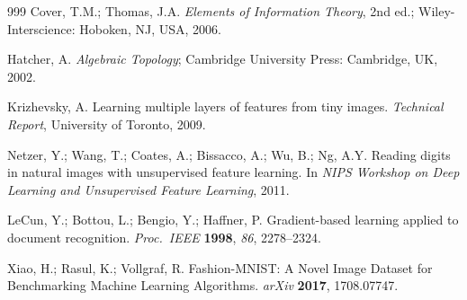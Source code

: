 \documentclass[make,article,submit,pdftex,moreauthors]{Definitions/mdpi}
\begin{document}
\begin{thebibliography}{999}
Cover, T.M.; Thomas, J.A.
\textit{Elements of Information Theory}, 2nd ed.;
Wiley-Interscience: Hoboken, NJ, USA, 2006.

Hatcher, A.
\textit{Algebraic Topology};
Cambridge University Press: Cambridge, UK, 2002.

Krizhevsky, A.
Learning multiple layers of features from tiny images.
\textit{Technical Report}, University of Toronto, 2009.

Netzer, Y.; Wang, T.; Coates, A.; Bissacco, A.; Wu, B.; Ng, A.Y.
Reading digits in natural images with unsupervised feature learning.
In \textit{NIPS Workshop on Deep Learning and Unsupervised Feature Learning},
2011.

LeCun, Y.; Bottou, L.; Bengio, Y.; Haffner, P.
Gradient-based learning applied to document recognition.
\textit{Proc.\ IEEE} \textbf{1998}, \textit{86}, 2278--2324.

Xiao, H.; Rasul, K.; Vollgraf, R.
Fashion-{MNIST}: A Novel Image Dataset for Benchmarking Machine Learning
Algorithms.
\textit{arXiv} \textbf{2017}, 1708.07747.

\end{thebibliography}
\end{document}
